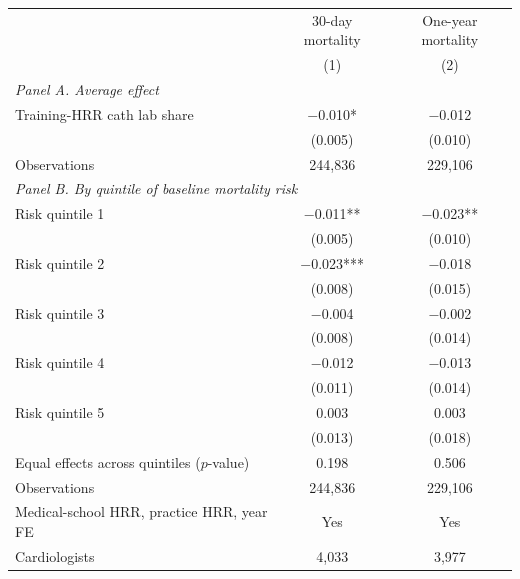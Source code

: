 \begin{tabular}{lcc}
\toprule
 & 30-day mortality & One-year mortality \\
 & (1) & (2) \\
\midrule
\multicolumn{3}{l}{\textit{Panel A. Average effect}} \\
Training-HRR cath lab share & $-$0.010* & $-$0.012 \\
 & (0.005) & (0.010) \\
Observations & 244,836 & 229,106 \\
\midrule
\multicolumn{3}{l}{\textit{Panel B. By quintile of baseline mortality risk}} \\
Risk quintile 1 & $-$0.011** & $-$0.023** \\
 & (0.005) & (0.010) \\
Risk quintile 2 & $-$0.023*** & $-$0.018 \\
 & (0.008) & (0.015) \\
Risk quintile 3 & $-$0.004 & $-$0.002 \\
 & (0.008) & (0.014) \\
Risk quintile 4 & $-$0.012 & $-$0.013 \\
 & (0.011) & (0.014) \\
Risk quintile 5 & 0.003 & 0.003 \\
 & (0.013) & (0.018) \\
Equal effects across quintiles ($p$-value) & 0.198 & 0.506 \\
Observations & 244,836 & 229,106 \\
\midrule
Medical-school HRR, practice HRR, year FE & Yes & Yes \\
Cardiologists & 4,033 & 3,977 \\
\bottomrule
\end{tabular}

